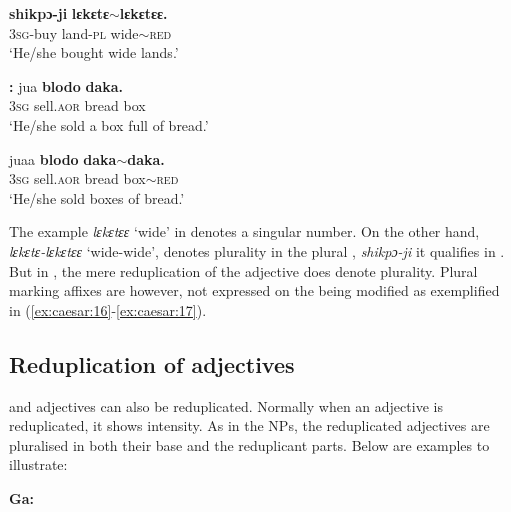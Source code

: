 \documentclass[output=paper,
modfonts
]{langscibook}
\begin{document}
\ea\label{ex:caesar:15}
 \textbf{{shikpɔ-ji}} \textbf{{lɛkɛtɛ{$\sim$}lɛkɛtɛɛ.}}\\
 3\textsc{sg}-buy land-\textsc{pl} wide{$\sim$}\textsc{red}\\
\glt ‘He/she bought wide lands.’
\z


\ea\label{ex:caesar:16}
\textbf{:}
 {jua} \textbf{{blodo}} \textbf{{daka.}}\\
3\textsc{sg} sell.\textsc{aor} bread box\\
\glt ‘He/she sold a box full of bread.’
\z



\ea\label{ex:caesar:17}
 {juaa} \textbf{{blodo}} \textbf{{daka{$\sim$}daka.}}\\
3\textsc{sg} sell.\textsc{aor} bread box{$\sim$}\textsc{red}\\
\glt ‘He/she sold boxes of bread.’
\z

The  example \textit{lɛkɛtɛɛ} ‘wide’ in  denotes a singular number. On the other hand, \textit{lɛkɛtɛ-lɛkɛtɛɛ} ‘wide-wide’, denotes plurality in the plural , \textit{shikpɔ-ji} it qualifies in . But in , the mere reduplication of the adjective does denote plurality. Plural marking affixes are however, not expressed on the  being modified as exemplified in (\ref{ex:caesar:16}-\ref{ex:caesar:17}). 

\subsection{Reduplication of adjectives}\label{sec:caesar:3.3} 

 and  adjectives can also be reduplicated. Normally when an adjective is reduplicated, it shows intensity. As in the NPs, the reduplicated adjectives are pluralised in both their base and the reduplicant parts. Below are examples to illustrate: 



\ea\label{ex:caesar:18}

\textbf{Ga:}\\
\\
\\
\\
\\ 
\z
\end{document}
